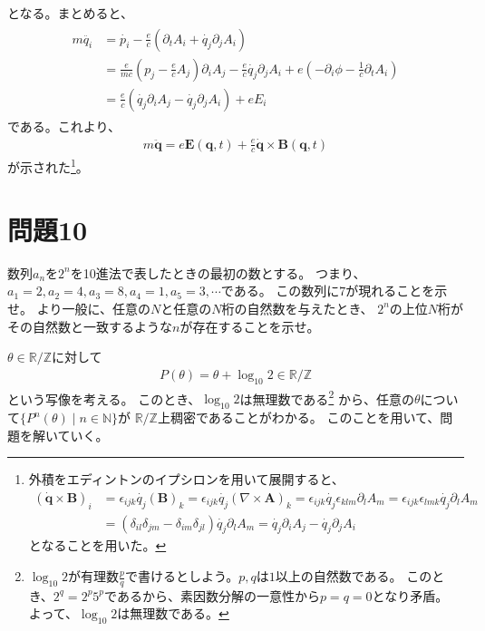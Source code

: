 \documentclass{jsarticle}
\begin{document}
となる。まとめると、
\begin{align}
\begin{split}
m\ddot{q_{i}}&=\dot{p_{i}}-\frac{e}{c}\left(\partial_{t}A_{i}+\dot{q_{j}}\partial_{j}A_{i}\right)\\
&=\frac{e}{mc}\left(p_{j}
-\frac{e}{c}A_{j}\right)\partial_{i}A_{j}
-\frac{e}{c}\dot{q_{j}}\partial_{j}A_{i}
+e\left(-\partial_{i}\phi-\frac{1}{c}\partial_{t}A_{i}\right)\\
&=\frac{e}{c}\left(\dot{q_{j}}\partial_{i}A_{j}-\dot{q_{j}}\partial_{j}A_{i}\right)+eE_{i}
\end{split}
\end{align}
である。これより、
\begin{align}
m\ddot{\pmb{q}}=e\pmb{E}(\pmb{q},t)+\frac{e}{c}\dot{\pmb{q}}\times\pmb{B}(\pmb{q},t)
\end{align}
が示された\footnote{
外積をエディントンのイプシロンを用いて展開すると、
\begin{align*}
(\dot{\pmb{q}}\times\pmb{B})_{i}&=\epsilon_{ijk}\dot{q_{j}}(\pmb{B})_{k}
=\epsilon_{ijk}\dot{q_{j}}(\nabla\times\pmb{A})_{k}
=\epsilon_{ijk}\dot{q_{j}}\epsilon_{klm}\partial_{l}A_{m}
=\epsilon_{ijk}\epsilon_{lmk}\dot{q_{j}}\partial_{l}A_{m}\\
&=\left(\delta_{il}\delta_{jm}-\delta_{im}\delta_{jl}\right)\dot{q_{j}}\partial_{l}A_{m}
=\dot{q_{j}}\partial_{i}A_{j}-\dot{q_{j}}\partial_{j}A_{i}
\end{align*}
となることを用いた。
}。


\section*{問題10}
\begin{shaded}
数列$a_{n}$を$2^{n}$を10進法で表したときの最初の数とする。
つまり、$a_{1}=2,a_{2}=4,a_{3}=8,a_{4}=1,a_{5}=3,\cdots$である。
この数列に$7$が現れることを示せ。
より一般に、任意の$N$と任意の$N$桁の自然数を与えたとき、
$2^{n}$の上位$N$桁がその自然数と一致するような$n$が存在することを示せ。
\end{shaded}

$\theta\in\mathbb{R}/\mathbb{Z}$に対して
\begin{align}
P(\theta)=\theta+\log_{10}{2}\in\mathbb{R}/\mathbb{Z}
\end{align}
という写像を考える。
このとき、$\log_{10}{2}$は無理数である\footnote{
$\log_{10}{2}$が有理数$\frac{p}{q}$で書けるとしよう。$p,q$は$1$以上の自然数である。
このとき、$2^{q}=2^{p}5^{p}$であるから、素因数分解の一意性から$p=q=0$となり矛盾。
よって、$\log_{10}{2}$は無理数である。
}
から、任意の$\theta$について$\{P^{n}(\theta)\mid n\in\mathbb{N}\}$が
$\mathbb{R}/\mathbb{Z}$上稠密であることがわかる。
このことを用いて、問題を解いていく。
\end{document}
